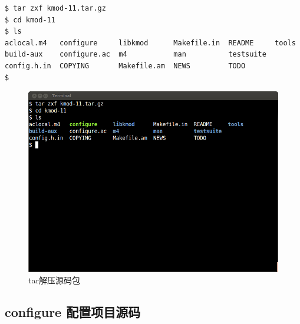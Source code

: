 {\begin{shaded}\begin{verbatim}
$ tar zxf kmod-11.tar.gz 
$ cd kmod-11
$ ls
aclocal.m4   configure     libkmod      Makefile.in  README     tools
build-aux    configure.ac  m4           man          testsuite
config.h.in  COPYING       Makefile.am  NEWS         TODO
$ 
\end{verbatim}\end{shaded}}
\begin{figure}[htbp]
\centering
\includegraphics{./pictures/1-2-tar.png}
\caption{tar解压源码包}
\end{figure}

\subsection{configure 配置项目源码}

